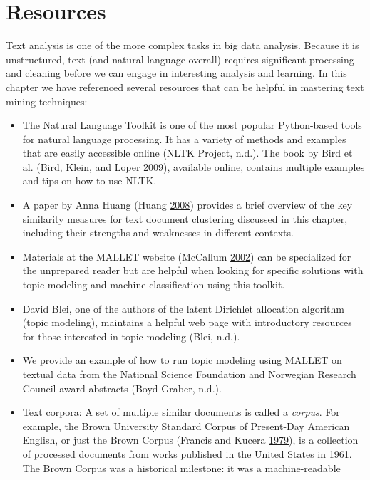 \documentclass[]{krantz}
\begin{document}
\section{Resources}\label{resources-3}

Text analysis is one of the more complex tasks in big data analysis.
Because it is unstructured, text (and natural language overall) requires
significant processing and cleaning before we can engage in interesting
analysis and learning. In this chapter we have referenced several
resources that can be helpful in mastering text mining techniques:

\begin{itemize}
\item
  The Natural Language Toolkit is one of the most popular Python-based
  tools for natural language processing. It has a variety of methods and
  examples that are easily accessible online (NLTK Project, n.d.). The
  book by Bird et al. (Bird, Klein, and Loper
  \protect\hyperlink{ref-bird-09}{2009}), available online, contains
  multiple examples and tips on how to use NLTK.
\item
  A paper by Anna Huang (Huang \protect\hyperlink{ref-huang-08}{2008})
  provides a brief overview of the key similarity measures for text
  document clustering discussed in this chapter, including their
  strengths and weaknesses in different contexts.
\item
  Materials at the MALLET website (McCallum
  \protect\hyperlink{ref-mallet}{2002}) can be specialized for the
  unprepared reader but are helpful when looking for specific solutions
  with topic modeling and machine classification using this toolkit.
\item
  David Blei, one of the authors of the latent Dirichlet allocation
  algorithm (topic modeling), maintains a helpful web page with
  introductory resources for those interested in topic modeling (Blei,
  n.d.).
\item
  We provide an example of how to run topic modeling using MALLET on
  textual data from the National Science Foundation and Norwegian
  Research Council award abstracts (Boyd-Graber, n.d.).
\item
  Text corpora: A set of multiple similar documents is called a
  \emph{corpus}. For example, the Brown University Standard Corpus of
  Present-Day American English, or just the Brown Corpus (Francis and
  Kucera \protect\hyperlink{ref-browncorpus}{1979}), is a collection of
  processed documents from works published in the United States in 1961.
  The Brown Corpus was a historical milestone: it was a machine-readable

\end{itemize}
\end{document}
